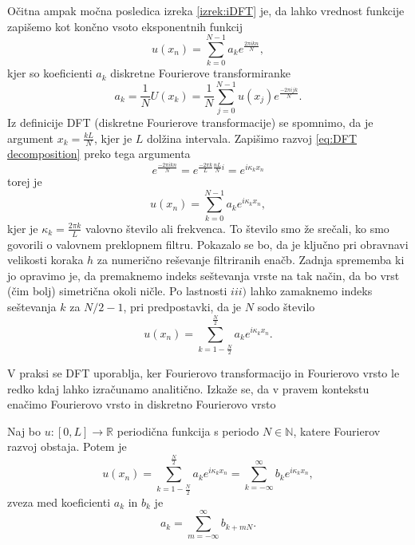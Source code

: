 \documentclass[mat2, tisk]{fmfdelo}
\newcommand{\R}{\mathbb R}
\newcommand{\N}{\mathbb N}
\begin{document}
Očitna ampak močna posledica izreka \ref{izrek:iDFT} je, da lahko 
vrednost funkcije zapišemo kot končno vsoto eksponentnih funkcij 
\begin{equation}
  \label{eq:DFT decomposition}
u(x_n) = \sum_{k=0}^{N-1} a_k e^{\frac{2\pi i k n}{N}},
\end{equation}
kjer so koeficienti $a_k$ diskretne Fourierove transformiranke 
\begin{equation}
a_k = \frac{1}{N} U(x_k) = \frac{1}{N} \sum_{j=0}^{N-1} u(x_j) e^{\frac{-2\pi i j k}{N}}.
\end{equation}
Iz definicije DFT (diskretne Fourierove transformacije) se spomnimo, da je 
argument $x_k = \frac{k L}{N}$, kjer je $L$ dolžina intervala. Zapišimo 
razvoj \ref{eq:DFT decomposition} preko tega argumenta 
$$
e^{\frac{-2\pi i k n}{N}} = e^{\frac{-2\pi k}{L}\frac{nL}{N}i} = e^{i\kappa_k x_n}
$$
torej je 
\begin{equation}
u(x_n) = \sum_{k=0}^{N-1} a_k e^{i\kappa_k x_n},
\end{equation}
kjer je $\kappa_k = \frac{2\pi k}{L}$ valovno število ali frekvenca.
To število smo že srečali, ko smo govorili o valovnem preklopnem 
filtru. Pokazalo se bo, da je ključno pri obravnavi velikosti koraka $h$ 
za numerično reševanje filtriranih enačb. Zadnja sprememba ki 
jo opravimo je, da premaknemo indeks seštevanja vrste na tak način, da bo vrst (čim bolj) simetrična okoli ničle. 
Po lastnosti $iii)$ lahko zamaknemo indeks seštevanja $k$ za $N/2 - 1$, pri 
predpostavki, da je $N$ sodo število
\begin{equation}
  \label{eq:DFS expantion}
u(x_n) = \sum_{k=1-\frac{N}{2}}^{\frac{N}{2}} a_k e^{i\kappa_k x_n}.
\end{equation} 

V praksi se DFT uporablja, ker Fourierovo transformacijo in 
Fourierovo vrsto le redko kdaj lahko izračunamo analitično.
Izkaže se, da v pravem kontekstu enačimo Fourierovo vrsto in diskretno Fourierovo vrsto
\begin{izrek}
Naj bo $u: [0, L] \rightarrow \R$ periodična funkcija s periodo $N\in \N$, katere Fourierov 
razvoj obstaja. Potem je 
\begin{equation}
u(x_n) = \sum_{k=1-\frac{N}{2}}^{\frac{N}{2}} a_k e^{i\kappa_k x_n} =
\sum_{k=-\infty}^{\infty} b_k e^{i\kappa_k x_n},
\end{equation}
zveza med koeficienti $a_k$ in $b_k$ je
\begin{equation}
  a_k = \sum_{m=-\infty}^{\infty} b_{k + mN}. 
\end{equation}
\end{izrek}
\end{document}
